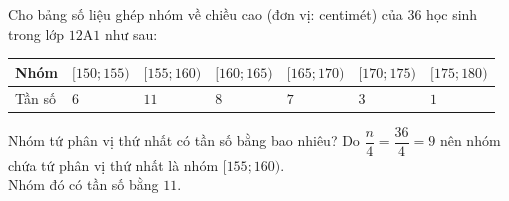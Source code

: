 \begin{ex}%
	Cho bảng số liệu ghép nhóm về chiều cao (đơn vị: centimét) của $36$ học sinh trong lớp $12$A$1$ như sau:
	\begin{center}
		\begin{tabular}{|>{\centering\arraybackslash}m{2cm}|>{\centering\arraybackslash}m{2cm}|>{\centering\arraybackslash}m{2cm}|>{\centering\arraybackslash}m{2cm}|>{\centering\arraybackslash}m{2cm}|>{\centering\arraybackslash}m{2cm}|>{\centering\arraybackslash}m{2cm}|}
			\hline
			Nhóm & $[150; 155)$ & $[155; 160)$ & $[160; 165)$ & $[165; 170)$ & $[170; 175)$ & $[175; 180)$  \\ \hline
			Tần số & $6$ & $11$ & $8$ & $7$ & $3$ & $1$ \\ \hline
		\end{tabular}
	\end{center}
	Nhóm tứ phân vị thứ nhất có tần số bằng bao nhiêu?
	\loigiai
	{ Do $\dfrac{n}{4} = \dfrac{36}{4} = 9$ nên nhóm chứa tứ phân vị thứ nhất là nhóm $[155; 160)$. \\
	Nhóm đó có tần số bằng $11$.
	}
\end{ex}


